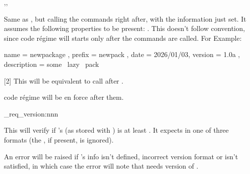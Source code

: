 \documentclass[10pt]{article}
\begin{document}


\begin{codedescribe}[code,update=2026/01/03]{\pkginfograbProvidesExplPackage,\pkginfograbProvidesExplClass,\pkginfograbProvidesExplFile}
\begin{codesyntax}%
\end{codesyntax}
Same as , but calling the  commands \tsobj[code,sep=or]{\ProvidesExplPackage,\ProvidesExplClass,\ProvidesExplFile} 
right after, with the information just set. It assumes the following properties to be present: .  This doesn't follow  convention, since  code régime will starts only after the commands  are called. For Example:
\end{codedescribe}

 
\begin{codestore}[demoA]
  { 
    name         = {newpackage} ,
    prefix       = {newpack} ,
    date         = {2026/01/03},
    version      = {1.0a} ,
    description  = {some~ lazy~ pack}
  }
\end{codestore}

[2]
This will be equivalent to call  after . 
\begin{tsremark}
   code régime will be en force after them.
\end{tsremark}
\begin{codedescribe}{\pkginfograb_req_version:nnn}
\begin{codesyntax}%
\end{codesyntax}
This will verify if 's  (as stored with ) is at least . It expects  in one of three formats  (the \tsobj[key]{[v]}, if present, is ignored).
\end{codedescribe}
\begin{tsremark}
  An error will be raised if 's info isn't defined, incorrect version format or  isn't satisfied, in which case the error will note that  needs version  of .
\end{tsremark}
\end{document}
